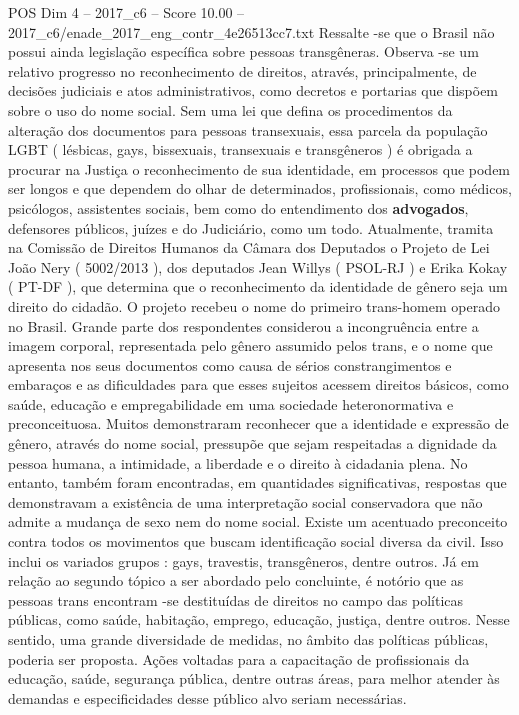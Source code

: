 \begin{textsample}{POS Dim 4 – 2017\_c6 – Score 10.00 – 2017\_c6/enade\_2017\_eng\_contr\_4e26513cc7.txt}
Ressalte -se que o Brasil não possui ainda legislação específica sobre pessoas transgêneras.
Observa -se um relativo progresso no reconhecimento de direitos, através, principalmente, de decisões judiciais e atos administrativos, como decretos e portarias que dispõem sobre o uso do nome social.
Sem uma lei que defina os procedimentos da alteração dos documentos para pessoas transexuais, essa parcela da população LGBT ( lésbicas, gays, bissexuais, transexuais e transgêneros ) é obrigada a procurar na Justiça o reconhecimento de sua identidade, em processos que podem ser longos e que dependem do olhar de determinados, profissionais, como médicos, psicólogos, assistentes sociais, bem como do entendimento dos \textbf{advogados}, defensores públicos, juízes e do Judiciário, como um todo.
Atualmente, tramita na Comissão de Direitos Humanos da Câmara dos Deputados o Projeto de Lei João Nery ( 5002/2013 ), dos deputados Jean Willys ( PSOL-RJ ) e Erika Kokay ( PT-DF ), que determina que o reconhecimento da identidade de gênero seja um direito do cidadão.
O projeto recebeu o nome do primeiro trans-homem operado no Brasil.
Grande parte dos respondentes considerou a incongruência entre a imagem corporal, representada pelo gênero assumido pelos trans, e o nome que apresenta nos seus documentos como causa de sérios constrangimentos e embaraços e as dificuldades para que esses sujeitos acessem direitos básicos, como saúde, educação e empregabilidade em uma sociedade heteronormativa e preconceituosa.
Muitos demonstraram reconhecer que a identidade e expressão de gênero, através do nome social, pressupõe que sejam respeitadas a dignidade da pessoa humana, a intimidade, a liberdade e o direito à cidadania plena.
No entanto, também foram encontradas, em quantidades significativas, respostas que demonstravam a existência de uma interpretação social conservadora que não admite a mudança de sexo nem do nome social.
Existe um acentuado preconceito contra todos os movimentos que buscam identificação social diversa da civil.
Isso inclui os variados grupos : gays, travestis, transgêneros, dentre outros.
Já em relação ao segundo tópico a ser abordado pelo concluinte, é notório que as pessoas trans encontram -se destituídas de direitos no campo das políticas públicas, como saúde, habitação, emprego, educação, justiça, dentre outros.
Nesse sentido, uma grande diversidade de medidas, no âmbito das políticas públicas, poderia ser proposta.
Ações voltadas para a capacitação de profissionais da educação, saúde, segurança pública, dentre outras áreas, para melhor atender às demandas e especificidades desse público alvo seriam necessárias.

\end{textsample}
